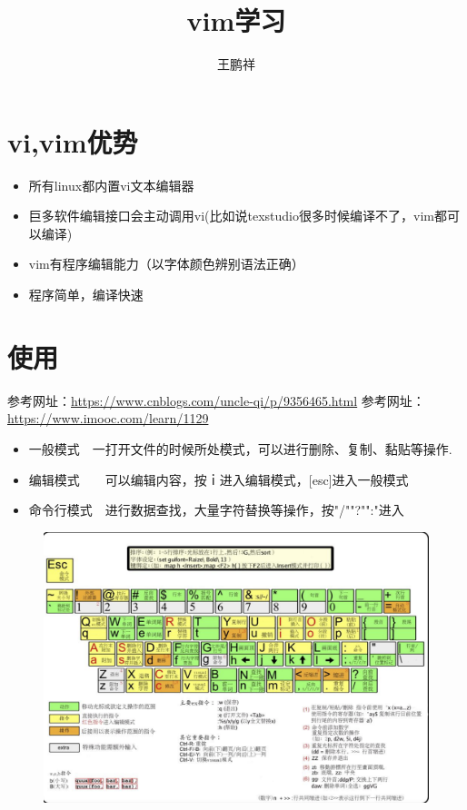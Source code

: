 \documentclass{article}
\begin{document}
	\title{vim学习}
	\author{王鹏祥}
	\date{\chntoday}
	\maketitle
	\newpage

\section{vi,vim优势}
\begin{itemize}
	\item 所有linux都内置vi文本编辑器
	\item {\color{red}巨多}软件编辑接口会主动调用vi(比如说texstudio很多时候编译不了，vim都可以编译)
	\item vim有程序编辑能力（以字体颜色辨别语法正确）
	\item 程序简单，编译快速
\end{itemize}
\section{使用}
参考网址：\url{https://www.cnblogs.com/uncle-qi/p/9356465.html}
参考网址：\url{https://www.imooc.com/learn/1129}
\begin{itemize}
	\item 一般模式　一打开文件的时候所处模式，可以进行删除、复制、黏贴等操作.
	\item 编辑模式　　可以编辑内容，按ｉ进入编辑模式，[esc]进入一般模式
	\item 命令行模式　进行数据查找，大量字符替换等操作，按"/""?"":"进入
\end{itemize}

\begin{figure}[H]
\centering
\includegraphics[scale=0.5]{figures/vim}
\end{figure}
\end{document}
